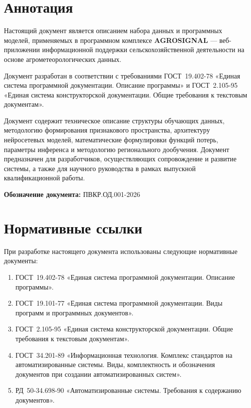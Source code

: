 \documentclass[14pt,a4paper]{extarticle}
\begin{document}
\newpage
\tableofcontents
\newpage

\section*{Аннотация}

Настоящий документ является описанием набора данных и программных моделей,
применяемых в программном комплексе \textbf{AGROSIGNAL} — веб-приложении
информационной поддержки сельскохозяйственной деятельности на основе
агрометеорологических данных.

Документ разработан в соответствии с требованиями ГОСТ~19.402-78
«Единая система программной документации. Описание программы»
и ГОСТ~2.105-95 «Единая система конструкторской документации.
Общие требования к текстовым документам».

Документ содержит техническое описание структуры обучающих данных, методологию
формирования признакового пространства, архитектуру нейросетевых моделей,
математические формулировки функций потерь, параметры инференса и методологию
регионального дообучения. Документ предназначен для разработчиков, осуществляющих
сопровождение и развитие системы, а также для научного руководства в рамках
выпускной квалификационной работы.

\textbf{Обозначение документа:} ПВКР.ОД.001-2026

\section*{Нормативные ссылки}

При разработке настоящего документа использованы следующие нормативные документы:

\begin{enumerate}
  \item ГОСТ~19.402-78 «Единая система программной документации.
        Описание программы».
  \item ГОСТ~19.101-77 «Единая система программной документации.
        Виды программ и программных документов».
  \item ГОСТ~2.105-95 «Единая система конструкторской документации.
        Общие требования к текстовым документам».
  \item ГОСТ~34.201-89 «Информационная технология. Комплекс стандартов
        на автоматизированные системы. Виды, комплектность и обозначения
        документов при создании автоматизированных систем».
  \item РД~50-34.698-90 «Автоматизированные системы.
        Требования к содержанию документов».
\end{enumerate}
\end{document}
